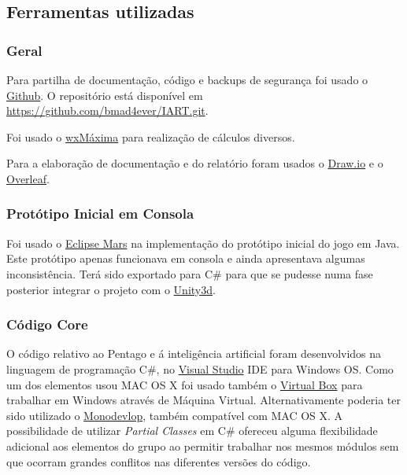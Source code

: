 
\subsection{Ferramentas utilizadas}

\subsubsection{Geral}

Para partilha de documentação, código e backups de segurança foi usado o \href{https://github.com/}{Github}.
O repositório está disponível em \href{https://github.com/bmad4ever/IART.git}{https://github.com/bmad4ever/IART.git}.

Foi usado o \href{http://andrejv.github.io/wxmaxima/}{wxMáxima} para realização de cálculos diversos.

Para a elaboração de documentação e do relatório foram usados o \href{https://www.draw.io/}{Draw.io} e o \href{https://www.overleaf.com}{Overleaf}.

\subsubsection{Protótipo Inicial em Consola}

Foi usado o \href{https://eclipse.org/mars/}{Eclipse Mars} na implementação do protótipo inicial do jogo em Java. Este protótipo apenas funcionava em consola e ainda apresentava algumas inconsistência. Terá sido exportado para C\# para que se pudesse numa fase posterior integrar o projeto com o \href{https://unity3d.com/pt}{Unity3d}. 

\subsubsection{Código Core}

O código relativo ao Pentago e á inteligência artificial foram desenvolvidos na linguagem de programação C\#, no \href{https://www.visualstudio.com/}{Visual Studio} IDE para Windows OS. Como um dos elementos usou MAC OS X foi usado também o \href{https://www.virtualbox.org/}{Virtual Box} para trabalhar em Windows através de Máquina Virtual. Alternativamente poderia ter sido utilizado o \href{http://www.monodevelop.com/}{Monodevlop}, também compatível com MAC OS X.
A possibilidade de utilizar \emph{Partial Classes} em C\# ofereceu alguma flexibilidade adicional aos elementos do grupo ao permitir trabalhar nos mesmos módulos sem que ocorram grandes conflitos nas diferentes versões do código.

